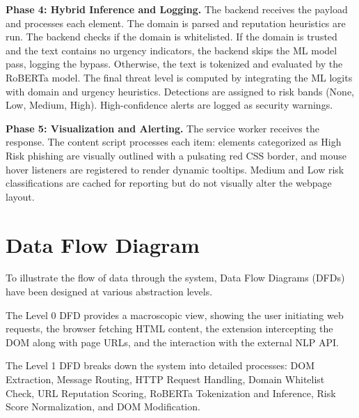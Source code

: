 \textbf{Phase 4: Hybrid Inference and Logging.} The backend receives the payload and processes each element. The domain is parsed and reputation heuristics are run. The backend checks if the domain is whitelisted. If the domain is trusted and the text contains no urgency indicators, the backend skips the ML model pass, logging the bypass. Otherwise, the text is tokenized and evaluated by the RoBERTa model. The final threat level is computed by integrating the ML logits with domain and urgency heuristics. Detections are assigned to risk bands (None, Low, Medium, High). High-confidence alerts are logged as security warnings.

\textbf{Phase 5: Visualization and Alerting.} The service worker receives the response. The content script processes each item: elements categorized as High Risk phishing are visually outlined with a pulsating red CSS border, and mouse hover listeners are registered to render dynamic tooltips. Medium and Low risk classifications are cached for reporting but do not visually alter the webpage layout.

\section{Data Flow Diagram}

To illustrate the flow of data through the system, Data Flow Diagrams (DFDs) have been designed at various abstraction levels.

The Level 0 DFD provides a macroscopic view, showing the user initiating web requests, the browser fetching HTML content, the extension intercepting the DOM along with page URLs, and the interaction with the external NLP API.

The Level 1 DFD breaks down the system into detailed processes: DOM Extraction, Message Routing, HTTP Request Handling, Domain Whitelist Check, URL Reputation Scoring, RoBERTa Tokenization and Inference, Risk Score Normalization, and DOM Modification.
